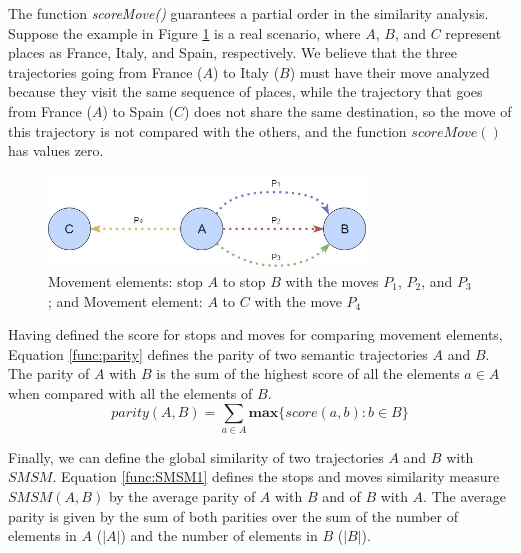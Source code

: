 \documentclass[12pt]{article}
\begin{document}
{The function \emph{scoreMove()} guarantees a partial order in the similarity analysis. %
Suppose the example in  Figure {\ref{fig:move}} is a real scenario, where $A$, $B$, and $C$ represent  places as France, Italy, and Spain, respectively. We believe that the three trajectories going from France ($A$) to Italy ($B$) must have their move analyzed because they visit the same sequence of places, while the trajectory that goes from France ($A$) to Spain ($C$) does not share the same destination, so the move of this trajectory is not compared with the others, and the function $scoreMove()$ has values zero.}



\begin{figure}[h]
\centering
\includegraphics[width=0.75\textwidth]{Images/Toy_trajectories.jpg}
\caption{\label{fig:move} Movement elements: stop $A$ to stop $B$ with the moves $P_1$, $P_2$, and $P_3$; and Movement element: $A$ to $C$ with the move $P_4$}
\end{figure}

Having defined the score for stops and moves for comparing movement elements, Equation \ref{func:parity} defines the parity of two semantic trajectories $A$ and $B$. The parity of $A$ with $B$ is the sum of the highest score of all the elements $a \in A$ when compared with all the elements of $B$.
\begin{equation}
\label{func:parity}
parity(A, B) = \sum\limits_{a\in A} \textbf{max}\{\textit{score}(a, b) : b \in B\}
\end{equation}

Finally, we can define the global similarity of two trajectories $A$ and $B$ with $SMSM$. Equation \ref{func:SMSM1} defines the stops and moves similarity measure $SMSM(A,B)$ by the average parity of $A$ with $B$ and of $B$ with $A$. {The average parity is given by the sum of both parities over the sum of the number of elements in $A$ ($|A|$) and the number of elements in $B$ ($|B|$).}
\end{document}
